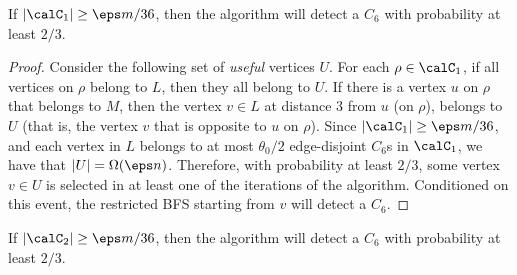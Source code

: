 \begin{claim}\label{clm:C6-1}
If $|\calC_1| \geq \eps m/36$, then the algorithm will detect a $C_6$ with probability at least $2/3$.
\end{claim}

\begin{proof}
Consider the following set of \emph{useful} vertices $U$. For each $\rho\in \calC_1$, if all vertices on $\rho$ belong to $L$, then they all belong to $U$. If there is a vertex $u$ on $\rho$ that belongs to $M$, then the vertex $v\in L$ at distance $3$ from $u$ (on $\rho$), belongs to $U$ (that is, the vertex $v$  that is opposite to $u$ on $\rho$). Since $|\calC_1| \geq \eps m/36$, and each vertex in $L$ belongs to at most $\theta_0/2$ edge-disjoint $C_6$s in $\calC_1$, we have that $|U| = \Omega(\eps n)$. Therefore, with probability at least $2/3$, some vertex $v\in U$ is selected in at least one of the iterations of the algorithm. Conditioned on this event, the restricted BFS starting from $v$ will detect a $C_6$.
\end{proof}

\begin{claim}\label{clm:C6-2}
If $|\calC_2| \geq \eps m/36$, then the algorithm will detect a $C_6$ with probability at least $2/3$.
\end{claim}

